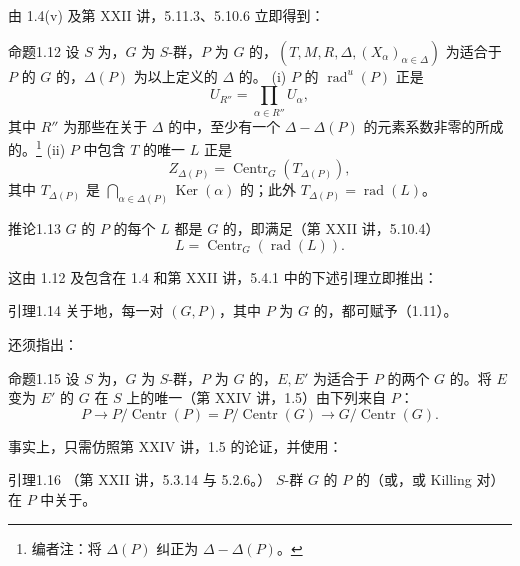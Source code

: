 由 1.4(v) 及第 XXII 讲，5.11.3、5.10.6 立即得到：
\begin{SGAresult}{命题}{1.12}
设 $S$ 为，$G$ 为 $S$-群，$P$ 为 $G$ 的，$(T,M,R,\Delta,(X_\alpha)_{\alpha\in\Delta})$ 为适合于 $P$ 的 $G$ 的，$\Delta(P)$ 为以上定义的 $\Delta$ 的。
(i) $P$ 的 $\operatorname{rad}^{u}(P)$ 正是
\[U_{R''}=\prod_{\alpha\in R''}U_\alpha,\]
其中 $R''$ 为那些在关于 $\Delta$ 的中，至少有一个 $\Delta-\Delta(P)$ 的元素系数非零的所成的。\footnote{编者注：将 $\Delta(P)$ 纠正为 $\Delta-\Delta(P)$。}
(ii) $P$ 中包含 $T$ 的唯一 $L$ 正是
\[Z_{\Delta(P)}=\operatorname{Centr}_G(T_{\Delta(P)}),\]
其中 $T_{\Delta(P)}$ 是 $\bigcap_{\alpha\in\Delta(P)}\operatorname{Ker}(\alpha)$ 的；此外 $T_{\Delta(P)}=\operatorname{rad}(L)$。
\end{SGAresult}
\begin{SGAresult}{推论}{1.13}
 $G$ 的 $P$ 的每个 $L$ 都是 $G$ 的，即满足（第 XXII 讲，5.10.4）
\[L=\operatorname{Centr}_G(\operatorname{rad}(L)).\]
\end{SGAresult}
这由 1.12 及包含在 1.4 和第 XXII 讲，5.4.1 中的下述引理立即推出：
\begin{SGAresult}{引理}{1.14}
关于地，每一对 $(G,P)$，其中 $P$ 为 $G$ 的，都可赋予（1.11）。
\end{SGAresult}
还须指出：
\begin{SGAresult}{命题}{1.15}
设 $S$ 为，$G$ 为 $S$-群，$P$ 为 $G$ 的，$E,E'$ 为适合于 $P$ 的两个 $G$ 的。将 $E$ 变为 $E'$ 的 $G$ 在 $S$ 上的唯一（第 XXIV 讲，1.5）由下列来自 $P$：
\[P\longrightarrow P/\operatorname{Centr}(P)=P/\operatorname{Centr}(G)\longrightarrow G/\operatorname{Centr}(G).\]
\end{SGAresult}
事实上，只需仿照第 XXIV 讲，1.5 的论证，并使用：
\begin{SGAresult}{引理}{1.16}
（第 XXII 讲，5.3.14 与 5.2.6。）
 $S$-群 $G$ 的 $P$ 的（或，或 Killing 对）在 $P$ 中关于。
\end{SGAresult}

